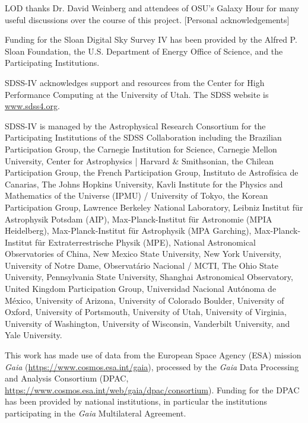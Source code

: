 \documentclass[twocolumn,twocolappendix,linenumbers,trackchanges]{aastex631}
\begin{document}
\begin{acknowledgments}
    LOD thanks Dr. David Weinberg and attendees of OSU's Galaxy Hour for many useful discussions over the course of this project.
    [Personal acknowledgements]
    
    Funding for the Sloan Digital Sky 
    Survey IV has been provided by the 
    Alfred P. Sloan Foundation, the U.S. 
    Department of Energy Office of 
    Science, and the Participating 
    Institutions. 
    
    SDSS-IV acknowledges support and 
    resources from the Center for High 
    Performance Computing  at the 
    University of Utah. The SDSS 
    website is \url{www.sdss4.org}.
    
    SDSS-IV is managed by the 
    Astrophysical Research Consortium 
    for the Participating Institutions 
    of the SDSS Collaboration including 
    the Brazilian Participation Group, 
    the Carnegie Institution for Science, 
    Carnegie Mellon University, Center for 
    Astrophysics | Harvard \& 
    Smithsonian, the Chilean Participation 
    Group, the French Participation Group, 
    Instituto de Astrof\'isica de 
    Canarias, The Johns Hopkins 
    University, Kavli Institute for the 
    Physics and Mathematics of the 
    Universe (IPMU) / University of 
    Tokyo, the Korean Participation Group, 
    Lawrence Berkeley National Laboratory, 
    Leibniz Institut f\"ur Astrophysik 
    Potsdam (AIP),  Max-Planck-Institut 
    f\"ur Astronomie (MPIA Heidelberg), 
    Max-Planck-Institut f\"ur 
    Astrophysik (MPA Garching), 
    Max-Planck-Institut f\"ur 
    Extraterrestrische Physik (MPE), 
    National Astronomical Observatories of 
    China, New Mexico State University, 
    New York University, University of 
    Notre Dame, Observat\'ario 
    Nacional / MCTI, The Ohio State 
    University, Pennsylvania State 
    University, Shanghai 
    Astronomical Observatory, United 
    Kingdom Participation Group, 
    Universidad Nacional Aut\'onoma 
    de M\'exico, University of Arizona, 
    University of Colorado Boulder, 
    University of Oxford, University of 
    Portsmouth, University of Utah, 
    University of Virginia, University 
    of Washington, University of 
    Wisconsin, Vanderbilt University, 
    and Yale University.
    
    This work has made use of data from the European Space Agency (ESA) mission
    {\it Gaia} (\url{https://www.cosmos.esa.int/gaia}), processed by the {\it Gaia}
    Data Processing and Analysis Consortium (DPAC,
    \url{https://www.cosmos.esa.int/web/gaia/dpac/consortium}). Funding for the DPAC
    has been provided by national institutions, in particular the institutions
    participating in the {\it Gaia} Multilateral Agreement.


\end{acknowledgments}
\end{document}

